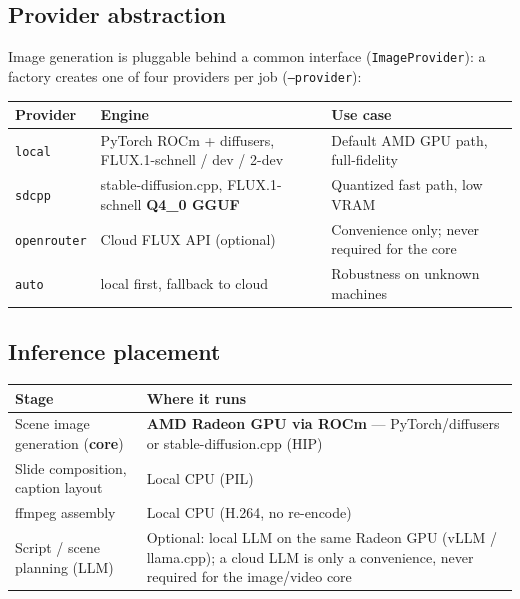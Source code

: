 \documentclass[UTF8,fontset=mac,a4paper,11pt]{ctexart}
\begin{document}
\subsection{Provider abstraction}

Image generation is pluggable behind a common interface
(\texttt{ImageProvider}): a factory creates one of four providers per job
(\texttt{--provider}):

\begin{table}[h]
  \centering
  \begin{tabular}{@{}p{2.6cm}p{6.4cm}p{5.4cm}@{}}
    \toprule
    \textbf{Provider} & \textbf{Engine} & \textbf{Use case} \\
    \midrule
    \texttt{local} & PyTorch ROCm + diffusers, FLUX.1-schnell / dev / 2-dev
      & Default AMD GPU path, full-fidelity \\
    \texttt{sdcpp} & stable-diffusion.cpp, FLUX.1-schnell \textbf{Q4\_0 GGUF}
      & Quantized fast path, low VRAM \\
    \texttt{openrouter} & Cloud FLUX API (optional)
      & Convenience only; never required for the core \\
    \texttt{auto} & local first, fallback to cloud
      & Robustness on unknown machines \\
    \bottomrule
  \end{tabular}
\end{table}

\subsection{Inference placement}

\begin{table}[h]
  \centering
  \begin{tabular}{@{}p{7.2cm}p{7.4cm}@{}}
    \toprule
    \textbf{Stage} & \textbf{Where it runs} \\
    \midrule
    Scene image generation (\textbf{core}) & \textbf{AMD Radeon GPU via ROCm}
      --- PyTorch/diffusers or stable-diffusion.cpp (HIP) \\
    Slide composition, caption layout & Local CPU (PIL) \\
    ffmpeg assembly & Local CPU (H.264, no re-encode) \\
    Script / scene planning (LLM) & Optional: local LLM on the same Radeon GPU
      (vLLM / llama.cpp); a cloud LLM is only a convenience, never required
      for the image/video core \\
    \bottomrule
  \end{tabular}
\end{table}
\end{document}
